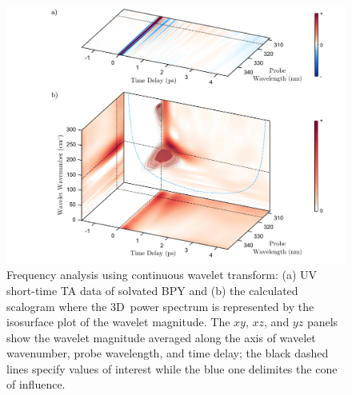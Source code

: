 \begin{figure}[ht!]
  \centering
  \includegraphics[width = \textwidth]{Figures/fig_BPY_TA_CWT.pdf}
  \caption[Frequency analysis using continuous wavelet transform.]{
    Frequency analysis using continuous wavelet transform:
    (a) UV short-time TA data of solvated BPY
    and (b) the calculated scalogram
    where the 3D~power spectrum is represented by the isosurface plot of the wavelet magnitude.
    The $xy$, $xz$, and $yz$ panels show the wavelet magnitude
    averaged along the axis of wavelet wavenumber, probe wavelength,
    and time delay;
    the black dashed lines specify values of interest
    while the blue one delimites the cone of influence.
  }
  \label{fig: BPY-TA-CWT}
\end{figure}

